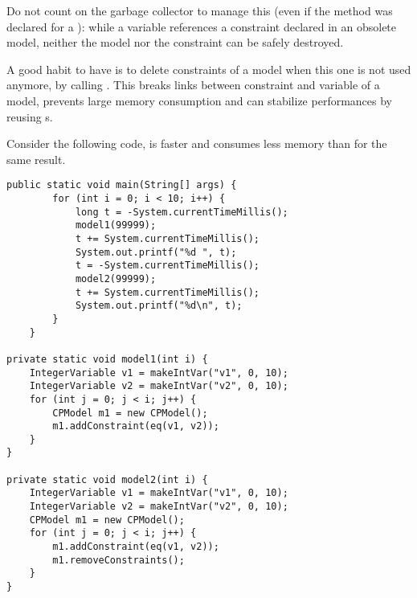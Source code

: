 \vspace{1cm}
\begin{notedef}
Do not count on the garbage collector to manage this (even if the  method was declared for a ): while a variable references a constraint declared in an obsolete model, neither the model nor the constraint can be safely destroyed. 

A good habit to have is to delete constraints of a model when this one is not used anymore, by calling . This breaks links between constraint and variable of a model, prevents large memory consumption and can stabilize performances by reusing s.


Consider the following code,  is faster and consumes less memory than  for the same result.
\begin{lstlisting}
public static void main(String[] args) {
        for (int i = 0; i < 10; i++) {
            long t = -System.currentTimeMillis();
            model1(99999);
            t += System.currentTimeMillis();
            System.out.printf("%d ", t);
            t = -System.currentTimeMillis();
            model2(99999);
            t += System.currentTimeMillis();
            System.out.printf("%d\n", t);
        }
    }                                               
                                                 
private static void model1(int i) {              
    IntegerVariable v1 = makeIntVar("v1", 0, 10);
    IntegerVariable v2 = makeIntVar("v2", 0, 10);
    for (int j = 0; j < i; j++) {                
        CPModel m1 = new CPModel();              
        m1.addConstraint(eq(v1, v2));            
    }                                            
}                                                
                                                 
private static void model2(int i) {              
    IntegerVariable v1 = makeIntVar("v1", 0, 10);
    IntegerVariable v2 = makeIntVar("v2", 0, 10);
    CPModel m1 = new CPModel();                  
    for (int j = 0; j < i; j++) {                
        m1.addConstraint(eq(v1, v2));            
        m1.removeConstraints();                  
    }                                            
}                                                
\end{lstlisting}

\end{notedef}




